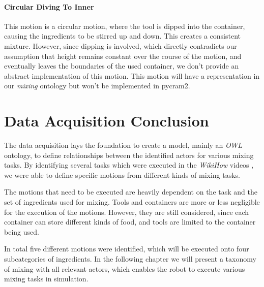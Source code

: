 \paragraph{Circular Diving To Inner}
This motion is a circular motion, where the tool is dipped into the container, causing the ingredients to be stirred up and down.
This creates a consistent mixture. However, since dipping is involved, 
which directly contradicts our assumption that height remains constant over the course of the motion, and eventually leaves the boundaries of the used container, 
we don't provide an abstract implementation of this motion. This motion will have a representation in our \textit{mixing} ontology but won't be implemented in pycram2.


\section{Data Acquisition Conclusion}
The data acquisition lays the foundation to create a model, mainly an \textit{OWL} ontology, to define relationships between the identified actors for various mixing tasks.
By identifying several tasks which were executed in the \textit{WikiHow} videos \cite{wikihow}, we were able to define specific motions from different 
kinds of mixing tasks. 

The motions that need to be executed are heavily dependent on the task and the set of ingredients used for mixing.
Tools and containers are more or less negligible for the execution of the motions. 
However, they are still considered, since each container can store different kinds of food, and tools are limited to the container being used.

In total five different motions were identified, which will be executed onto four subcategories of ingredients. 
In the following chapter we will present a taxonomy of mixing with all relevant actors, which enables the robot to execute various mixing tasks in simulation. 
\newpage